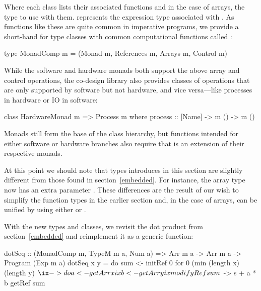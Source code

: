 \documentclass[../main.tex]{subfiles}
\begin{document}
\noindent Where each class lists their associated functions and in the case of arrays, the type to use with them.  represents the expression type associated with . As functions like these are quite common in imperative programs, we provide a short-hand for type classes with common computational functions called :

\begin{code}
type MonadComp m = (Monad m, References m, Arrays m, Control m)
\end{code}


While the software and hardware monads both support the above array and control operations, the co-design library also provides classes of operations that are only supported by software but not hardware, and vice versa---like processes in hardware or IO in software:

\begin{code}
class HardwareMonad m => Process m where
  process :: [Name] -> m () -> m ()
\end{code}

\noindent Monads still form the base of the class hierarchy, but functions intended for either software or hardware branches also require that  is an extension of their respective monads.

At this point we should note that types introduces in this section are slightly different from those found in section~\ref{embedded}. For instance, the array type now has an extra parameter . These differences are the result of our wish to simplify the function types in the earlier section and, in the case of arrays, can be unified by using either  or .

With the new types and classes, we revisit the dot product from section~\ref{embedded} and reimplement it as a generic function:

\begin{code}
dotSeq :: (MonadComp m, TypeM m a, Num a) =>
  Arr m a -> Arr m a -> Program (Exp m a)
dotSeq x y = do
  sum <- initRef 0
  for 0 (min (length x) (length y) $ \ix -> do
    a <- getArr x ix
    b <- getArr y ix
    modifyRef sum $ \s -> s + a * b
  getRef sum
\end{code}
\end{document}
